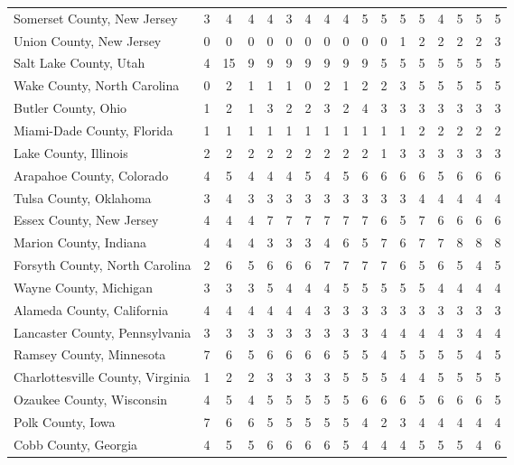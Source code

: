 \begin{landscape}
\begin{longtable}{lcccccccccccccccc}
	Somerset County, New Jersey & 3 & 4 & 4 & 4 & 3 & 4 & 4 & 4 & 5 & 5 & 5 & 5 & 4 & 5 & 5 & 5 \\
	Union County, New Jersey & 0 & 0 & 0 & 0 & 0 & 0 & 0 & 0 & 0 & 0 & 1 & 2 & 2 & 2 & 2 & 3 \\
	Salt Lake County, Utah & 4 & 15 & 9 & 9 & 9 & 9 & 9 & 9 & 9 & 5 & 5 & 5 & 5 & 5 & 5 & 5 \\
	Wake County, North Carolina & 0 & 2 & 1 & 1 & 1 & 0 & 2 & 1 & 2 & 2 & 3 & 5 & 5 & 5 & 5 & 5 \\
	Butler County, Ohio & 1 & 2 & 1 & 3 & 2 & 2 & 3 & 2 & 4 & 3 & 3 & 3 & 3 & 3 & 3 & 3 \\
	Miami-Dade County, Florida & 1 & 1 & 1 & 1 & 1 & 1 & 1 & 1 & 1 & 1 & 1 & 2 & 2 & 2 & 2 & 2 \\
	Lake County, Illinois & 2 & 2 & 2 & 2 & 2 & 2 & 2 & 2 & 2 & 1 & 3 & 3 & 3 & 3 & 3 & 3 \\
	Arapahoe County, Colorado & 4 & 5 & 4 & 4 & 4 & 5 & 4 & 5 & 6 & 6 & 6 & 6 & 5 & 6 & 6 & 6 \\
	Tulsa County, Oklahoma & 3 & 4 & 3 & 3 & 3 & 3 & 3 & 3 & 3 & 3 & 3 & 4 & 4 & 4 & 4 & 4 \\
	Essex County, New Jersey & 4 & 4 & 4 & 7 & 7 & 7 & 7 & 7 & 7 & 6 & 5 & 7 & 6 & 6 & 6 & 6 \\
	Marion County, Indiana & 4 & 4 & 4 & 3 & 3 & 3 & 4 & 6 & 5 & 7 & 6 & 7 & 7 & 8 & 8 & 8 \\
	Forsyth County, North Carolina & 2 & 6 & 5 & 6 & 6 & 6 & 7 & 7 & 7 & 7 & 6 & 5 & 6 & 5 & 4 & 5 \\
	Wayne County, Michigan & 3 & 3 & 3 & 5 & 4 & 4 & 4 & 5 & 5 & 5 & 5 & 5 & 4 & 4 & 4 & 4 \\
	Alameda County, California & 4 & 4 & 4 & 4 & 4 & 4 & 3 & 3 & 3 & 3 & 3 & 3 & 3 & 3 & 3 & 3 \\
	Lancaster County, Pennsylvania & 3 & 3 & 3 & 3 & 3 & 3 & 3 & 3 & 3 & 4 & 4 & 4 & 4 & 3 & 4 & 4 \\
	Ramsey County, Minnesota & 7 & 6 & 5 & 6 & 6 & 6 & 6 & 5 & 5 & 4 & 5 & 5 & 5 & 5 & 4 & 5 \\
	Charlottesville County, Virginia & 1 & 2 & 2 & 3 & 3 & 3 & 3 & 5 & 5 & 5 & 4 & 4 & 5 & 5 & 5 & 5 \\
	Ozaukee County, Wisconsin & 4 & 5 & 4 & 5 & 5 & 5 & 5 & 5 & 6 & 6 & 6 & 5 & 6 & 6 & 6 & 5 \\
	Polk County, Iowa & 7 & 6 & 6 & 5 & 5 & 5 & 5 & 5 & 4 & 2 & 3 & 4 & 4 & 4 & 4 & 4 \\
	Cobb County, Georgia & 4 & 5 & 5 & 6 & 6 & 6 & 6 & 5 & 4 & 4 & 4 & 5 & 5 & 5 & 4 & 6 \\

\end{longtable}
\end{landscape}
